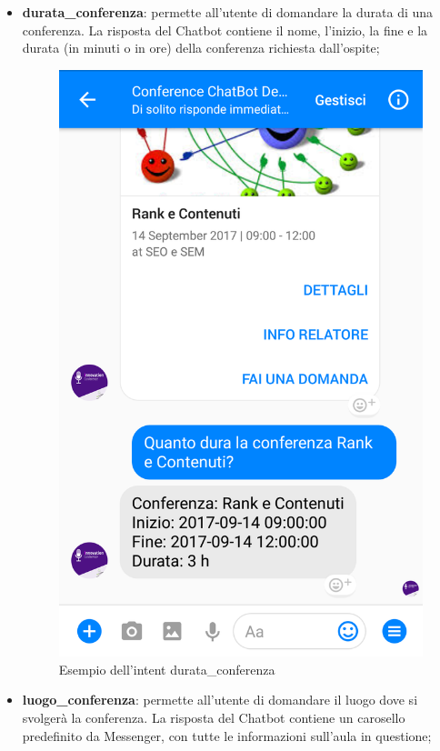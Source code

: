 \begin{itemize}
	\item \textbf{durata\_conferenza}: permette all'utente di domandare la durata di una conferenza. La risposta del \gls{Chatbot} contiene il nome, l'inizio, la fine e la durata (in minuti o in ore) della conferenza richiesta dall'ospite;
	\begin{figure}[h]
		\centering
		\includegraphics[scale=0.16]{../Immagini/durata.png}
		\caption{Esempio dell'intent durata\_conferenza}
	\end{figure}
	\item \textbf{luogo\_conferenza}: permette all'utente di domandare il luogo dove si svolgerà la conferenza. La risposta del \gls{Chatbot} contiene un carosello predefinito da Messenger, con tutte le informazioni sull'aula in questione;

\end{itemize}
